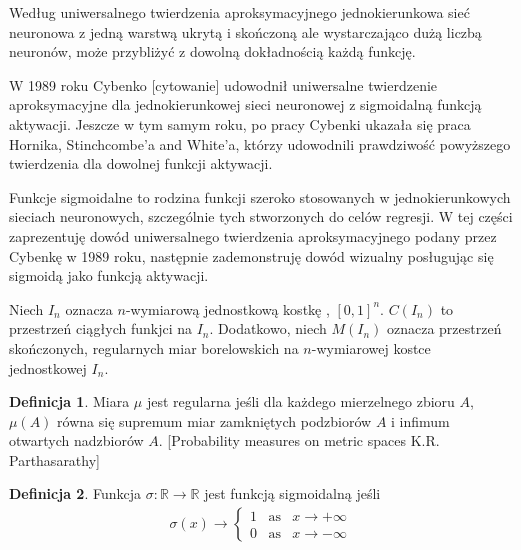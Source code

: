 \documentclass[11pt]{book}
\theoremstyle{definition}
\newtheorem{definition}{Definicja}[section]
\begin{document}
Według uniwersalnego twierdzenia aproksymacyjnego jednokierunkowa sieć neuronowa z jedną warstwą ukrytą i skończoną ale wystarczająco dużą liczbą neuronów, może przybliżyć z dowolną dokładnością każdą funkcję.

W 1989 roku Cybenko [cytowanie] udowodnił uniwersalne twierdzenie aproksymacyjne dla jednokierunkowej sieci neuronowej z sigmoidalną funkcją aktywacji. Jeszcze w tym samym roku, po pracy Cybenki ukazała się praca Hornika, Stinchcombe'a and White'a, którzy udowodnili prawdziwość powyższego twierdzenia dla dowolnej funkcji aktywacji.

Funkcje sigmoidalne to rodzina funkcji szeroko stosowanych w jednokierunkowych sieciach neuronowych, szczególnie tych stworzonych do celów regresji. W tej części zaprezentuję dowód uniwersalnego twierdzenia aproksymacyjnego podany przez Cybenkę w 1989 roku, następnie zademonstruję dowód wizualny posługując się sigmoidą jako funkcją aktywacji.



Niech $I_n$ oznacza $n$-wymiarową jednostkową kostkę , $[0,1]^n$. $C(I_n)$ to przestrzeń ciągłych funkjci na $I_n$. Dodatkowo, niech $M(I_n)$ oznacza przestrzeń skończonych, regularnych miar borelowskich na $n$-wymiarowej kostce jednostkowej $I_n$.

\begin{definition}
	Miara $\mu$ jest regularna jeśli dla każdego mierzelnego zbioru $A$, $\mu(A)$ równa się supremum miar zamkniętych podzbiorów $A$ i infimum otwartych nadzbiorów $A$. [Probability measures on metric spaces K.R. Parthasarathy]	
\end{definition}


% 
% 

\begin{definition}
	Funkcja $\sigma: \mathbb{R} \rightarrow \mathbb{R}$ jest funkcją sigmoidalną jeśli
	\begin{eqnarray*}
		\sigma(x) \rightarrow \begin{cases} 1 \;\;\;\text{as} &x \rightarrow +\infty\\ 0 \;\;\;\text{as} &x \rightarrow -\infty\end{cases}
	\end{eqnarray*}
	
\end{definition}
\end{document}
